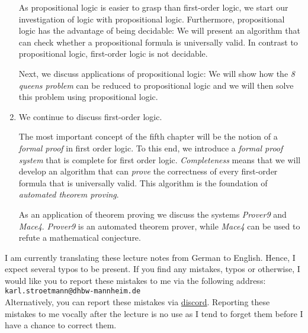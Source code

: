 \begin{enumerate}
      As propositional logic is easier to grasp than first-order logic, we start our investigation
      of logic with propositional logic.  Furthermore, propositional logic has the advantage of
      being decidable:  We will present an algorithm that can check whether a propositional formula
      is universally valid.  In contrast to propositional logic, first-order logic is not decidable.

      Next, we discuss applications of propositional logic:  We will show how the \emph{\color{blue}8 queens problem} 
      can be reduced to propositional logic and we will then solve this problem using propositional logic.
\item We continue to discuss first-order logic.

      The most important concept of the fifth chapter will be the notion of a \emph{\color{blue}formal proof} in
      first order logic.  To this end, we introduce a \emph{\color{blue}formal proof system} that is
      \colorbox{amethyst}{complete} for first order logic.  \emph{\color{blue}Completeness} means that we will develop an
      algorithm that can \emph{\color{blue}prove} the correctness of every first-order formula that is
      universally valid.  This algorithm is the foundation of \emph{\color{blue}automated theorem proving}.

      As an application of theorem proving we discuss the systems \textsl{Prover9} and
      \textsl{Mace4}.  \textsl{Prover9} is an automated theorem prover, while \textsl{Mace4} can be
      used to refute a mathematical conjecture.
\end{enumerate}

\remarkEng
I am currently translating these lecture notes from German to English.  Hence, I expect several typos to be present.  
If you find any mistakes, typos or otherwise, I would like you to report these mistakes to me via
the following address:
\\[0.2cm]
\hspace*{1.3cm}
\texttt{karl.stroetmann@dhbw-mannheim.de}
\\[0.2cm]
Alternatively, you can report these mistakes via \href{https://discordapp.com}{discord}.
Reporting these mistakes to me vocally after the lecture is no use as I tend to forget them before I
have a chance to correct them.


